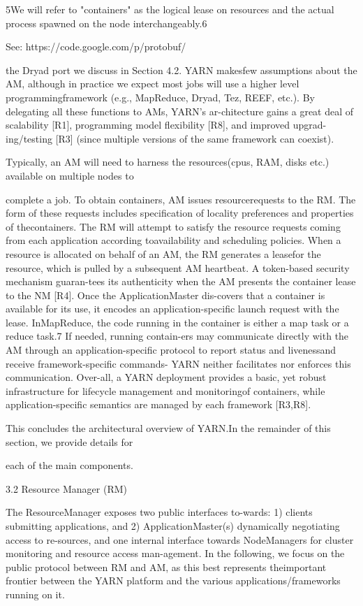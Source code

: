 5We will refer to "containers" as the logical lease on resources and
the actual process spawned on the node interchangeably.6

See: https://code.google.com/p/protobuf/

the Dryad port we discuss in Section 4.2. YARN makesfew assumptions about the AM, although in practice we
expect most jobs will use a higher level programmingframework (e.g., MapReduce, Dryad, Tez, REEF, etc.).
By delegating all these functions to AMs, YARN's ar-chitecture gains a great deal of scalability [R1], programming model flexibility [R8], and improved upgrad-ing/testing [R3] (since multiple versions of the same
framework can coexist).

Typically, an AM will need to harness the resources(cpus, RAM, disks etc.) available on multiple nodes to

complete a job. To obtain containers, AM issues resourcerequests to the RM. The form of these requests includes
specification of locality preferences and properties of thecontainers. The RM will attempt to satisfy the resource
requests coming from each application according toavailability and scheduling policies. When a resource is
allocated on behalf of an AM, the RM generates a leasefor the resource, which is pulled by a subsequent AM
heartbeat. A token-based security mechanism guaran-tees its authenticity when the AM presents the container
lease to the NM [R4]. Once the ApplicationMaster dis-covers that a container is available for its use, it encodes
an application-specific launch request with the lease. InMapReduce, the code running in the container is either
a map task or a reduce task.7 If needed, running contain-ers may communicate directly with the AM through an
application-specific protocol to report status and livenessand receive framework-specific commands- YARN neither facilitates nor enforces this communication. Over-all, a YARN deployment provides a basic, yet robust
infrastructure for lifecycle management and monitoringof containers, while application-specific semantics are
managed by each framework [R3,R8].

This concludes the architectural overview of YARN.In the remainder of this section, we provide details for

each of the main components.

3.2 Resource Manager (RM)

The ResourceManager exposes two public interfaces to-wards: 1) clients submitting applications, and 2) ApplicationMaster(s) dynamically negotiating access to re-sources, and one internal interface towards NodeManagers for cluster monitoring and resource access man-agement. In the following, we focus on the public protocol between RM and AM, as this best represents theimportant frontier between the YARN platform and the
various applications/frameworks running on it.

